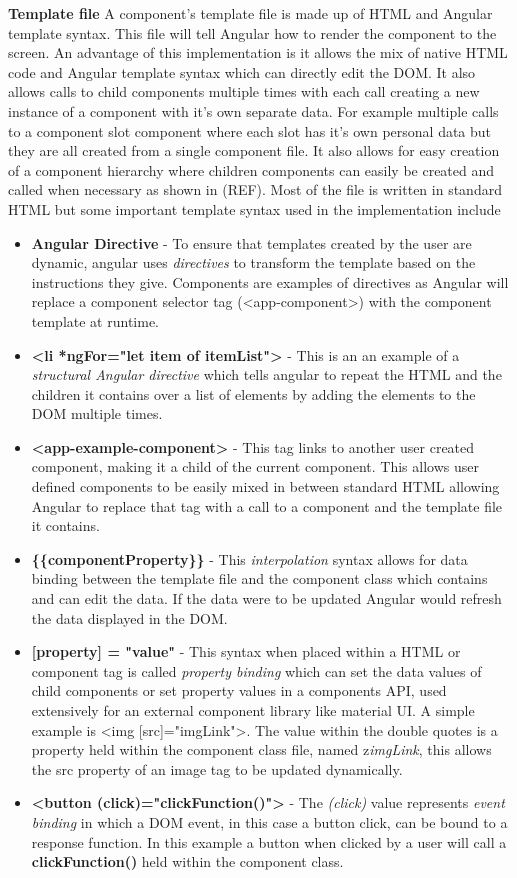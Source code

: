 \documentclass{l4proj}
\begin{document}
\textbf{Template file}
A component's template file is made up of HTML and Angular template syntax. This file will tell Angular how to render the component to the screen. An advantage of this implementation is it allows the mix of native HTML code and Angular template syntax which can directly edit the DOM. It also allows calls to child components multiple times with each call creating a new instance of a component with it's own separate data. For example multiple calls to a component slot component where each slot has it's own personal data but they are all created from a single component file. It also allows for easy creation of a component hierarchy where children components can easily be created and called when necessary as shown in (REF). Most of the file is written in standard HTML but some important template syntax used in the implementation include
\begin{itemize}
    \item \textbf{Angular Directive} - To ensure that templates created by the user are dynamic, angular uses \emph{directives} to transform the template based on the instructions they give. Components are examples of directives as Angular will replace a component selector tag (<app-component>) with the component template at runtime. 
    \item \textbf{<li *ngFor="let item of itemList">} - This is an an example of a \emph{structural Angular directive} which tells angular to repeat the HTML and the children it contains over a list of elements by adding the elements to the DOM multiple times. 
    \item \textbf{<app-example-component>} - This tag links to another user created component, making it a child of the current component. This allows user defined components to be easily mixed in between standard HTML allowing Angular to replace that tag with a call to a component and the template file it contains.
    \item \textbf{ \{\{componentProperty\}\}} - This \emph{interpolation} syntax allows for data binding between the template file and the component class which contains and can edit the data. If the data were to be updated Angular would refresh the data displayed in the DOM.
    \item \textbf{[property] = "value"} - This syntax when placed within a HTML or component tag is called \emph{property binding} which can set the data values of child components or set property values in a components API, used extensively for an external component library like material UI. A simple example is <img [src]="imgLink">. The value within the double quotes is a property held within the component class file, named z\emph{imgLink}, this allows the src property of an image tag to be updated dynamically.
    \item \textbf{<button (click)="clickFunction()">} - The \emph{(click)} value represents \emph{event binding} in which a DOM event, in this case a button click, can be bound to a response function. In this example a button when clicked by a user will call a \textbf{clickFunction()} held within the component class. 
\end{itemize}
\end{document}
